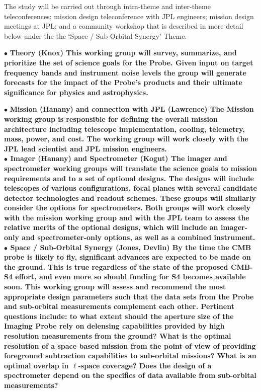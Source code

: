 The study will be carried out through intra-theme and inter-theme teleconferences; mission design teleconference with JPL engineers; 
mission design meetings at JPL; and a community workshop that is described in more detail below under the the `Space / Sub-Orbital 
Synergy' Theme. 

$\bullet$ \bf{Theory (Knox)} \hspace{0.1in} This working group will survey, summarize, and prioritize the set of 
science goals for the Probe.  Given input on target frequency bands and instrument noise levels the group will 
generate forecasts for the impact of the Probe's products and their ultimate 
significance for physics and astrophysics.

$\bullet$ \bf{Mission (Hanany) and connection with JPL (Lawrence)} \hspace{0.1in} The Mission working group is responsible 
for defining the overall mission 
architecture including telescope implementation, cooling, telemetry, mass, power, and cost. The working group will work closely 
with the JPL lead scientist and JPL mission engineers. \\

$\bullet$ \bf{Imager (Hanany) and Spectrometer (Kogut)} \hspace{0.1in} The imager and spectrometer working groups will 
translate the science goals to 
mission requirements and to a set of optional designs. The designs will include telescopes of various configurations, 
focal planes with several candidate detector technologies and readout schemes. These groups will similarly consider 
the options for spectrometers.  Both groups will work closely 
with the mission working group and with the JPL team to assess the relative merits 
of the optional designs, which will include an imager-only and spectrometer-only options, as well as a combined
instrument.  \\

$\bullet$ \bf{Space / Sub-Orbital Synergy (Jones, Devlin)} \hspace{0.1in} By the time the \ac{CMB} probe is likely to fly,
significant advances are expected to be made on the ground. This is true regardless of the state of the proposed CMB-S4
effort, and even more so should funding for S4 becomes available soon. This working group will assess and recommend the 
most appropriate design parameters such that the data sets from the Probe and sub-orbital measurements complement each other. 
Pertinent questions include: to what extent should the aperture size of the Imaging Probe rely on delensing capabilities provided by 
high resolution measurements from the ground? What is the optimal resolution of a space based mission from the point 
of view of providing foreground subtraction capabilities to sub-orbital missions? What is an optimal overlap in $\ell$-space
coverage? Does the design of a spectrometer depend on the specifics of data available from sub-orbital measurements? 


